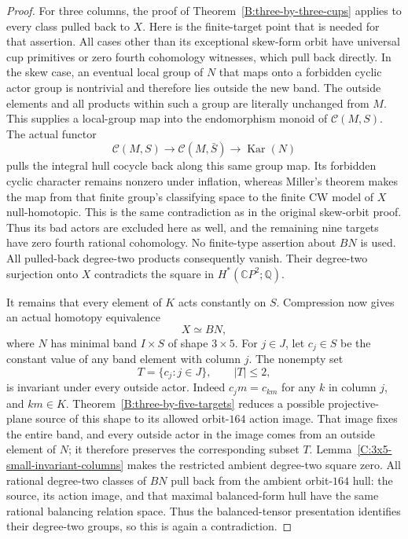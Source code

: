\begin{proof}
For three columns, the proof of
Theorem~\ref{B:three-by-three-cups} applies to every class
pulled back to $X$.  Here is the finite-target point that is
needed for that assertion.  All cases other than its exceptional
skew-form orbit have universal cup primitives or zero fourth
cohomology witnesses, which pull back directly.  In the skew
case, an eventual local group of $N$ that maps onto a forbidden
cyclic actor group is nontrivial and therefore lies outside the
new band.  The outside elements and all products within such
a group are literally unchanged from $M$.  This supplies a
local-group map into the endomorphism monoid of
$\mathcal C(M,S)$.  The actual functor
\[
 \mathcal C(M,S)\longrightarrow\mathcal C(M,\bar S)
       \longrightarrow\operatorname{Kar}(N)
\]
pulls the integral hull cocycle back along this same group map.
Its forbidden cyclic character remains nonzero under inflation,
whereas Miller's theorem makes the map from that finite group's
classifying space to the finite CW model of $X$ null-homotopic.
This is the same contradiction as in the original skew-orbit
proof.  Thus its bad actors are excluded here as well, and the
remaining nine targets have zero fourth rational cohomology.
No finite-type assertion about $BN$ is used.
All pulled-back degree-two products consequently vanish.
Their degree-two surjection onto $X$ contradicts the square in
$H^*(\mathbb CP^2;\mathbb Q)$.

It remains that every element of $K$ acts constantly on $S$.
Compression now gives an actual homotopy equivalence
\[
 X\simeq BN,
\]
where $N$ has minimal band $I\times S$ of shape $3\times5$.
For $j\in J$, let $c_j\in S$ be the constant value of
any band element with column $j$.  The nonempty set
\[
 T=\{c_j:j\in J\},\qquad |T|\leq2,
\]
is invariant under every outside actor.  Indeed
$c_jm=c_{km}$ for any $k$ in column $j$, and $km\in K$.
Theorem~\ref{B:three-by-five-targets} reduces a possible
projective-plane source of this shape to its allowed orbit-$164$
action image.  That image fixes the entire band, and every
outside actor in the image comes from an outside element of
$N$; it therefore preserves the corresponding subset $T$.
Lemma~\ref{C:3x5-small-invariant-columns} makes the restricted
ambient degree-two square zero.  All rational degree-two classes
of $BN$ pull back from the ambient orbit-$164$ hull: the source,
its action image, and that maximal balanced-form hull have the
same rational balancing relation space.  Thus the
balanced-tensor presentation identifies their degree-two groups,
so this is again a contradiction.
\end{proof}

